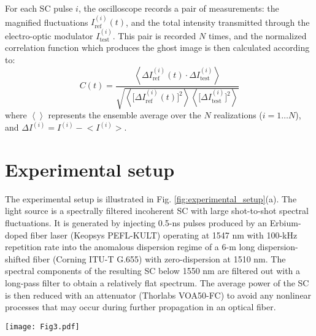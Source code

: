 \documentclass[aip,graphicx]{revtex4-1}
\begin{document}
For each SC pulse $i$, the oscilloscope records a pair of measurements: the magnified fluctuations $I_{\text{ref}}^{(i)}(t)$, and the total intensity transmitted through the electro-optic modulator $I_{\text{test}}^{(i)}$. This pair is recorded $N$ times, and the normalized correlation function which produces the ghost image is then calculated according to:
\begin{equation}
C(t) = \frac
{\left< \Delta I_{\text{ref}}^{(i)}(t) \cdot \Delta I_{\text{test}}^{(i)} \right>}
%
{\sqrt{\left< \bigg [\Delta I_{\text{ref}}^{(i)}(t)\bigg ]^2 \right> \left< \bigg[\Delta I_{\text{test}}^{(i)}\bigg]^2 \right>}}
\end{equation}
where $\left < \right>$ represents the ensemble average over the $N$ realizations ($i = 1\dots N$), and $\Delta I^{(i)}= I^{(i)}- \big <I^{(i)}\big >$.

\section{Experimental setup}
The experimental setup is illustrated in Fig. \ref{fig:experimental_setup}(a). The light source is a spectrally filtered incoherent SC with large shot-to-shot spectral fluctuations. It is generated by injecting 0.5-ns pulses produced by an Erbium-doped fiber laser (Keopsys PEFL-KULT) operating at 1547 nm with 100-kHz repetition rate into the anomalous dispersion regime of a 6-m long dispersion-shifted fiber (Corning ITU-T G.655) with zero-dispersion at 1510 nm. The spectral components of the resulting SC below 1550 nm are filtered out with a long-pass filter to obtain a relatively flat spectrum. The average power of the SC is then reduced with an attenuator (Thorlabs VOA50-FC) to avoid any nonlinear processes that may occur during further propagation in an optical fiber.
\begin{figure*}
	\centering
	\texttt{[image: Fig3.pdf]}
	\caption{Magnified time-domain ghost imaging experimental setup. (a) Setup. The synchronization unit allows to synchronize the electric signal driving the transmission function of the electro-optic (EO) modulator with the arrival time of the SC pulse at the modulator and trigger the oscilloscope. The inset in the “Light source” box shows the average SC spectrum as measured with an optical spectrum analyzer with 0.1-nm resolution. (b) Average of 10 000 temporal traces recorded (with a 12.5-GHz InGaAs photodiode, Electro-Optics Technology ET-3500F) at the ghost plane, showing that, after propagating in the 2.5-km fiber, the temporal profile of the SC reproduces its spectral shape (spectrum-to-time transformation). Inset: Examples of 5 distinct SC pulse traces recorded at the ghost plane together with the standard deviation (dotted black line) calculated over 10 000 realizations.}
	\label{fig:experimental_setup}
\end{figure*}
\end{document}
